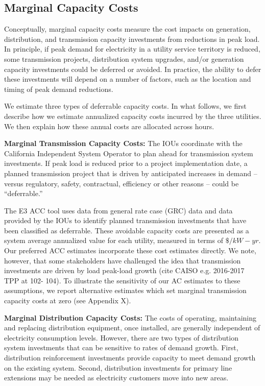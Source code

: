 \documentclass[11pt]{article}
\begin{document}
\subsection{Marginal Capacity Costs}

Conceptually, marginal capacity costs measure the cost impacts on generation, distribution, and transmission capacity investments from reductions in peak load. In principle, if peak demand for electricity in a utility service territory is reduced, some transmission projects, distribution system upgrades, and/or generation capacity investments could be deferred or avoided.  In practice, the ability to defer these investments will depend on a number of factors, such as the location and timing of peak demand reductions.

We estimate three types of deferrable capacity costs. In what follows, we first describe how we estimate annualized capacity costs incurred by the three utilities. We then explain how these annual costs are allocated across hours. 

\textbf{Marginal Transmission Capacity Costs:} The IOUs coordinate with the California Independent System Operator to plan ahead for transmission system investments. If peak load is reduced prior to a project implementation date,  a planned transmission project that is driven by anticipated increases in demand -- versus regulatory, safety, contractual, efficiency or other reasons -- could be ``deferrable.'' 

The E3 ACC tool uses data from general rate case (GRC) data and data provided by the IOUs to identify planned transmission investments that have been classified as deferrable.  These avoidable capacity costs are presented as a system average annualized value for each utility, measured in terms of $\$/kW-yr$.  Our preferred ACC estimates incorporate these cost estimates directly. We note, however, that some stakeholders have challenged the idea that transmission investments are driven by load peak-load growth	(cite	CAISO	e.g.	2016-2017 TPP	at	102- 104). To illustrate the sensitivity of our AC estimates to these assumptions, we report alternative estimates which set marginal transmission capacity costs at zero (see Appendix X).


\textbf{Marginal Distribution Capacity Costs:} The costs of operating, maintaining and replacing distribution equipment, once installed, are generally independent of electricity consumption levels.  However, there are two types of distribution system investments that can be sensitive to rates of demand growth. First, distribution reinforcement investments provide capacity to meet demand growth on the existing system. Second, distribution investments for primary line extensions may be needed as electricity customers move into new areas. 
\end{document}
